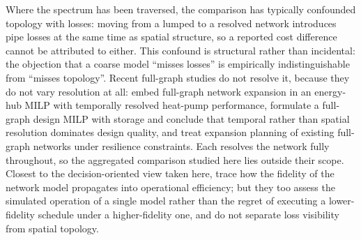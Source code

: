 Where the spectrum has been traversed, the comparison has typically confounded topology
with losses: moving from a lumped to a resolved network introduces pipe losses at the same
time as spatial structure, so a reported cost difference cannot be attributed to either.
This confound is structural rather than incidental: the objection that a coarse model
``misses losses'' is empirically indistinguishable from ``misses topology''. Recent full-graph studies do not resolve it,
because they do not vary resolution at all: \citet{Trentmann2026} embed full-graph
network expansion in an energy-hub MILP with temporally resolved heat-pump performance,
\citet{Ceruti2025} formulate a full-graph design MILP with storage and conclude that
temporal rather than spatial resolution dominates design quality, and
\citet{Vieth2026} treat expansion planning of existing full-graph networks under
resilience constraints. Each resolves the network fully throughout, so the aggregated
comparison studied here lies outside their scope. Closest to the decision-oriented view
taken here, \citet{Friedrich2025} trace how the fidelity of the network model propagates
into operational efficiency; but they too assess the simulated operation of a single model
rather than the regret of executing a lower-fidelity schedule under a higher-fidelity one,
and do not separate loss visibility from spatial topology.

